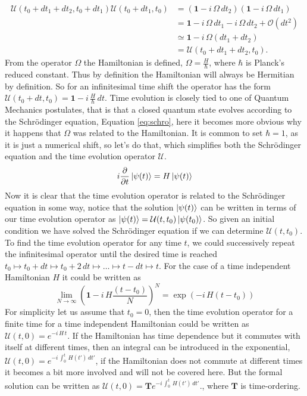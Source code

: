 \begin{equation}
\begin{aligned}
\mathcal{U}(t_0 + dt_1 + dt_2,t_0 + dt_1)\mathcal{U}(t_0 + dt_1,t_0) &= (\mathbf{1} - i\,\Omega\,dt_2)(\mathbf{1} - i\,\Omega\,dt_1) \\&= \mathbf{1} - i\,\Omega\,dt_1 - i\,\Omega\,dt_2 + \mathcal{O}(dt^2) \\&\simeq \mathbf{1} - i\,\Omega(dt_1 + dt_2) \\&= \mathcal{U}(t_0 + dt_1 + dt_2,t_0).
\end{aligned}
\end{equation}
From the operator $\Omega$ the Hamiltonian is defined, $\Omega = \frac{H}{\hbar}$, where $\hbar$ is Planck's reduced constant. Thus by definition the Hamiltonian will always be Hermitian by definition. So for an infinitesimal time shift the operator has the form $\mathcal{U}(t_0 + dt, t_0) = \mathbf{1} - i\,\frac{H}{\hbar} \,dt$.
Time evolution is closely tied to one of Quantum Mechanics postulates, that is that a closed quantum state evolves according to the Schrödinger equation, Equation \ref{eq:schro}, here it becomes more obvious why it happens that $\Omega$ was related to the Hamiltonian. It is common to set $\hbar = 1$, as it is just a numerical shift, so let's do that, which simplifies both the Schrödinger equation and the time evolution operator $\mathcal{U}$. 
\begin{equation} 
i \pdv{}{t} \ket{\psi(t)} = H \ket{\psi(t)}
\label{eq:schro}
\end{equation} 
Now it is clear that the time evolution operator is related to the Schrödinger equation in some way, notice that the solution $\ket{\psi(t)}$ can be written in terms of our time evolution operator as
$\ket{\psi(t)} = \mathcal{U}(t,t_0)\ket{\psi(t_0)}$. So given an initial condition we have solved the Schrödinger equation if we can determine $\mathcal{U}(t,t_0)$.  
To find the time evolution operator for any time $t$, we could successively repeat the infinitesimal operator until the desired time is reached $t_0 \mapsto t_0 + dt \mapsto t_0 + 2\,dt \mapsto \dots \mapsto t - dt \mapsto t$. For the case of a time independent Hamiltonian $H$ it could be written as
\begin{equation}
\lim_{N \rightarrow \infty} \left(\mathbf{1} - i\,H\frac{(t-t_0)}{N} \right)^N = \exp\left(- i\,H(t-t_0) \right)
\end{equation}
For simplicity let us assume that $t_0 = 0$, then the time evolution operator for a finite time for a time independent Hamiltonian could be written as $\mathcal{U}(t,0) = e^{-i\,H\,t}$. If the Hamiltonian has time dependence but it commutes with itself at different times, then an integral can be introduced in the exponential, $\mathcal{U}(t,0) = e^{-i\,\int_0^t \,H(t')\, dt'}$, if the Hamiltonian does not commute at different times it becomes a bit more involved and will not be covered here. But the formal solution can be written as $\mathcal{U}(t,0) = \mathbf{T}e^{-i\,\int_0^t \,H(t')\, dt'}$.,  where $\mathbf{T}$ is time-ordering.

